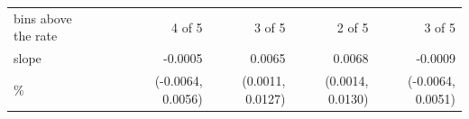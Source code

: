 \begin{tabular}{lrrrrrr}
bins above the rate &  &  & 4 of 5 & 3 of 5 & 2 of 5 & 3 of 5 \\
slope &  &  & -0.0005 & 0.0065 & 0.0068 & -0.0009 \\
\quad 90\% &  &  & (-0.0064, 0.0056) & (0.0011, 0.0127) & (0.0014, 0.0130) & (-0.0064, 0.0051) \\
\bottomrule
\end{tabular}

